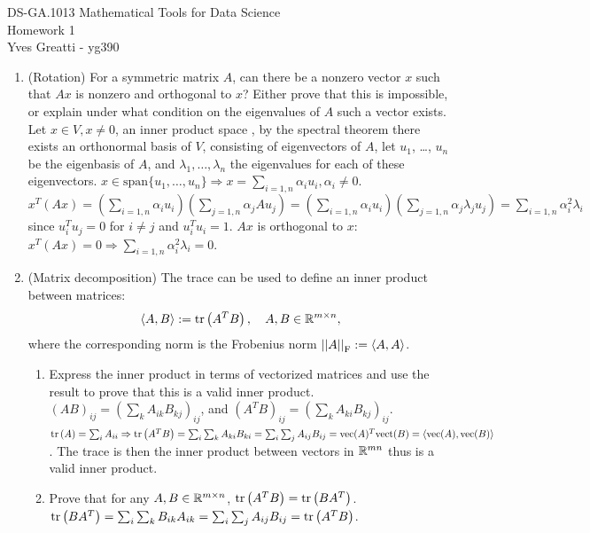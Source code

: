 \documentclass[12pt,twoside]{article}
\begin{document}
\noindent DS-GA.1013 Mathematical Tools for Data Science \\
Homework 1 \\
Yves Greatti - yg390\\


\begin{enumerate}
\item (Rotation) For a symmetric matrix $A$, can there be a nonzero vector $x$ such that $Ax$ is nonzero and orthogonal to $x$? Either prove that this is impossible, or explain under what condition on the eigenvalues of $A$ such a vector exists.
Let $x \in V, x \neq 0$, an inner product space , by the spectral theorem there exists an orthonormal basis of  $V$, consisting of eigenvectors of $A$, let $u_1$, \ldots, $u_n$ be the eigenbasis of $A$, and $\lambda_1, \ldots, \lambda_n$ the eigenvalues for each of these eigenvectors.
$x \in \text{span}\{u_1, \ldots, u_n \} \Rightarrow  x=\sum_{i=1,n} \alpha_i u_i, \alpha_i \neq 0$.  $x^T (Ax) = (\sum_{i=1,n} \alpha_i u_i) (\sum_{j=1,n} \alpha_j A u_j) =  (\sum_{i=1,n} \alpha_i u_i) (\sum_{j=1,n} \alpha_j \lambda_j u_j) = \sum_{i=1,n} \alpha_i^2 \lambda_i$ since $u_i^T u_j = 0$ for $i \neq j$ and $u_i^T u_i =1$. $Ax$ is orthogonal to $x$: $x^T (Ax) = 0 \Rightarrow  \sum_{i=1,n} \alpha_i^2 \lambda_i = 0$.

\item (Matrix decomposition) The trace can be used to define an inner product between matrices:
\begin{align}
\left \langle A, B\right \rangle := \operatorname{tr}\left( A^TB \right), \quad A,B \in \mathbb{R}^{m \times n},
\end{align}
where the corresponding norm is the Frobenius norm $\left|\left| A \right|\right| _{\operatorname{F}}:=\left \langle A, A\right \rangle$.
\begin{enumerate}
\item Express the inner product in terms of vectorized matrices and use the result to prove that this is a valid inner product.
$(A B)_{ij} = (\sum_k A_{ik} B_{kj})_{ij}$, and $(A^TB) _{ij} = (\sum_k A_{ki} B_{kj})_{ij}$.
$\operatorname{tr}\left( A \right) = \sum_i A_{ii}  \Rightarrow \operatorname{tr}\left( A^TB \right) = \sum_i \sum_k A_{ki} B_{ki} = \sum_i \sum_j A_{ij} B_{ij} = \text{vec}(A)^T \text{vect}(B) = \left \langle \text{vec}(A), \text{vec}(B)\right \rangle$.
The trace is then the inner product between vectors in $\mathbb{R}^{mn}$ thus is a valid inner product.

\item Prove that for any $A,B \in \mathbb{R}^{m \times n}$, $\operatorname{tr}\left( A^TB \right)=\operatorname{tr}\left( BA^T \right)$.
$\operatorname{tr}\left( BA^T \right) =  \sum_i \sum_k B_{ik} A_{ik} =  \sum_i \sum_j A_{ij} B_{ij} =  \operatorname{tr}\left( A^TB \right)$.


\end{enumerate}
\end{enumerate}
\end{document}
